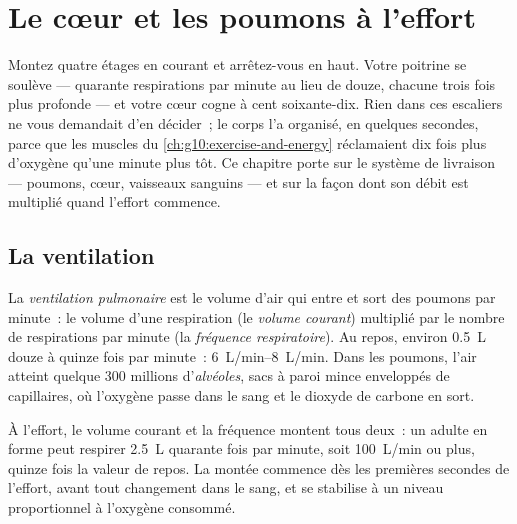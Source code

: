 \chapter{Le cœur et les poumons à l'effort}\label{ch:g10:heart-lungs-effort}

Montez quatre étages en courant et arrêtez-vous en haut. Votre poitrine
se soulève --- quarante respirations par minute au lieu de douze,
chacune trois fois plus profonde --- et votre cœur cogne à cent
soixante-dix. Rien dans ces escaliers ne vous demandait d'en décider~;
le corps l'a organisé, en quelques secondes, parce que les muscles du
\cref{ch:g10:exercise-and-energy} réclamaient dix fois plus d'oxygène
qu'une minute plus tôt. Ce chapitre porte sur le système de livraison
--- poumons, cœur, vaisseaux sanguins --- et sur la façon dont son
débit est multiplié quand l'effort commence.

\section{La ventilation}

\begin{definition}[Ventilation]\label{def:g10:heart-lungs-effort:ventilation}
La \emph{ventilation pulmonaire} est le volume d'air
qui entre et sort des poumons par minute~: le volume d'une respiration
(le \emph{volume courant}) multiplié par le nombre de respirations par
minute (la \emph{fréquence respiratoire}). Au repos, environ
\qty{0.5}{L} douze à quinze fois par minute~: \qtyrange{6}{8}{L/min}.
Dans les poumons, l'air atteint quelque 300 millions
d'\emph{alvéoles}, sacs à paroi mince enveloppés de
capillaires, où l'oxygène passe dans le sang et le dioxyde de carbone
en sort.
\end{definition}

\begin{proposition}\label{prop:g10:heart-lungs-effort:vent-exercise}
À l'effort, le volume courant et la fréquence montent tous deux~: un
adulte en forme peut respirer \qty{2.5}{L} quarante fois par minute,
soit \qty{100}{L/min} ou plus, quinze fois la valeur de repos. La
montée commence dès les premières secondes de l'effort, avant tout
changement dans le sang, et se stabilise à un niveau proportionnel à
l'oxygène consommé.
\end{proposition}
\admitted

